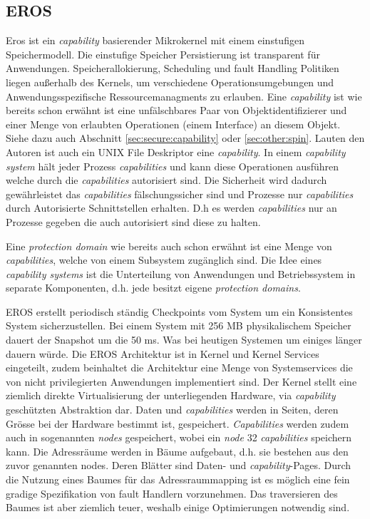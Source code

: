 \documentclass[11pt,technote]{IEEEtran}
\begin{document}
    \subsection{EROS}      
      Eros ist ein \textit{capability} basierender Mikrokernel mit einem einstufigen Speichermodell. 
      Die einstufige Speicher Persistierung ist transparent f\"ur Anwendungen. Speicherallokierung, Scheduling und fault Handling Politiken 
      liegen au\ss erhalb des Kernels, um verschiedene Operationsumgebungen und Anwendungsspezifische Ressourcemanagments zu erlauben.
      Eine \textit{capability} ist wie bereits schon erw\"ahnt ist eine unf\"alschbares Paar von Objektidentifizierer und einer Menge von erlaubten Operationen
      (einem Interface) an diesem Objekt. Siehe dazu auch Abschnitt \ref{sec:secure:capability} oder \ref{sec:other:spin}.
      Lauten den Autoren ist auch ein UNIX File Deskriptor eine \textit{capability}. In einem \textit{capability system} 
      h\"alt jeder Prozess \textit{capabilities} und kann diese Operationen ausf\"uhren welche durch die \textit{capabilities} autorisiert sind. 
      Die Sicherheit wird dadurch gew\"ahrleistet das \textit{capabilities} f\"alschungssicher sind und Prozesse nur \textit{capabilities} durch
      Autorisierte Schnittstellen erhalten. D.h es werden \textit{capabilities} nur an Prozesse gegeben die auch autorisiert sind diese zu halten.
        
      Eine \textit{protection domain} wie bereits auch schon erw\"ahnt ist eine Menge von \textit{capabilities}, welche von einem Subsystem zug\"anglich sind.
      Die Idee eines \textit{capability systems} ist die Unterteilung von Anwendungen und Betriebssystem in separate Komponenten, d.h. jede besitzt eigene
      \textit{protection domains}.
        
      EROS erstellt periodisch st\"andig Checkpoints vom System um ein Konsistentes System sicherzustellen. Bei einem System mit 256 MB physikalischem Speicher
      dauert der Snapshot um die 50 ms. Was bei heutigen Systemen um einiges l\"anger dauern w\"urde.
      Die EROS Architektur ist in Kernel und Kernel Services eingeteilt, zudem beinhaltet die Architektur eine Menge von Systemservices
      die von nicht privilegierten Anwendungen implementiert sind.
      Der Kernel stellt eine ziemlich direkte Virtualisierung der unterliegenden Hardware, via \textit{capability} gesch\"utzten Abstraktion dar.
      Daten und \textit{capabilities} werden in Seiten, deren Gr\"osse bei der Hardware bestimmt ist, gespeichert. 
      \textit{Capabilities} werden zudem auch in sogenannten \textit{nodes} gespeichert, wobei ein \textit{node} 32 \textit{capabilities} speichern kann.
      Die Adressr\"aume werden in B\"aume aufgebaut, d.h. sie bestehen aus den zuvor genannten nodes. Deren Bl\"atter sind Daten- und \textit{capability}-Pages.
      Durch die Nutzung eines Baumes f\"ur das Adressraummapping ist es m\"oglich eine fein gradige Spezifikation von fault Handlern vorzunehmen.
      Das traversieren des Baumes ist aber ziemlich teuer, weshalb einige Optimierungen notwendig sind. 
        
\end{document}
